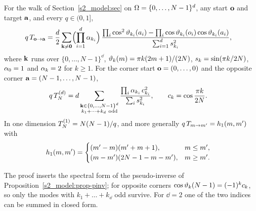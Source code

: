 \begin{theorem}\label{s4_mfpt:thm-cosine}
For the walk of Section~\ref{s2_model:sec} on $\Omega=\{0,\dots,N-1\}^{d}$, any start $\mathbf{o}$ and
target $\mathbf{a}$, and every $q\in(0,1]$,
\begin{equation}\label{s4_mfpt:eq-cosine}
  q\,T_{\mathbf{o}\to\mathbf{a}}=\frac{d}{2}\sum_{\mathbf{k}\neq\mathbf 0}
  \Bigl(\prod_{i=1}^{d}\alpha_{k_i}\Bigr)\,
  \frac{\prod_{i}\cos^{2}\vartheta_{k_i}(a_i)-\prod_{i}\cos\vartheta_{k_i}(o_i)\cos\vartheta_{k_i}(a_i)}
       {\sum_{i=1}^{d}s_{k_i}^{2}},
\end{equation}
where $\mathbf{k}$ runs over $\{0,\dots,N-1\}^{\dd}$, $\vartheta_{k}(m)=\pi k(2m+1)/(2N)$, $s_{k}=\sin(\pi k/2N)$, $\alpha_{0}=1$ and
$\alpha_{k}=2$ for $k\ge1$. For the corner start $\mathbf{o}=(0,\dots,0)$ and the opposite corner $\mathbf{a}=(N-1,\dots,N-1)$,
\begin{equation}\label{s4_mfpt:eq-cosine-cc}
  q\,T_{N}^{(d)}=d\sum_{\substack{\mathbf{k}\in\{0,\dots,N-1\}^{d}\\ k_1+\dots+k_{d}\ \mathrm{odd}}}
  \frac{\prod_i \alpha_{k_i}\,c_{k_i}^{2}}{\sum_i s_{k_i}^{2}},\qquad c_{k}=\cos\frac{\pi k}{2N}.
\end{equation}
In one dimension $T_{N}^{(1)}=N(N-1)/q$, and more generally $q\,T_{m\to m'}=h_{1}(m,m')$ with
\begin{equation}\label{s4_mfpt:eq-1d}
  h_{1}(m,m')=\begin{cases}(m'-m)(m'+m+1), & m\le m',\\ (m-m')(2N-1-m-m'), & m\ge m'.\end{cases}
\end{equation}
\end{theorem}

The proof inserts the spectral form of the pseudo-inverse of Proposition~\ref{s2_model:prop-pinv}; for opposite
corners $\cos\vartheta_{k}(N-1)=(-1)^{k}c_{k}$, so only the modes with $k_1+\dots+k_{\dd}$ odd survive. For $\dd=2$ one of
the two indices can be summed in closed form.

